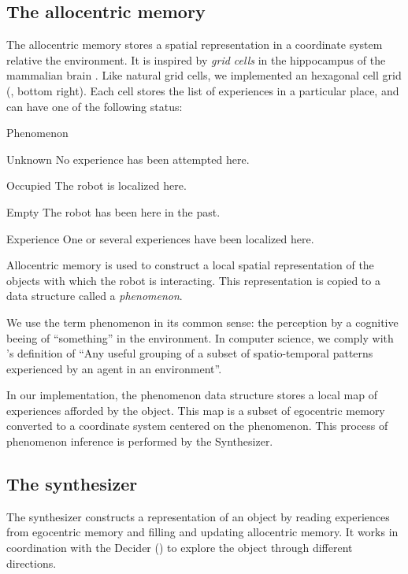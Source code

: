 \documentclass[pmlr]{jmlr}%
\begin{document}
\subsection{The allocentric memory}

The allocentric memory stores a spatial representation in a coordinate system relative the environment. 
It is inspired by \textit{grid cells} in the hippocampus of the mammalian brain \citep{grieves_representation_2017}.
Like natural grid cells, we implemented an hexagonal cell grid (, bottom right). 
Each cell stores the list of experiences in a particular place, and can have one of the following status:

\begin{altdescription}{Phenomenon}
	\item[Unknown] No experience has been attempted here.
	\item[Occupied] The robot is localized here.
	\item[Empty] The robot has been here in the past.
	\item[Experience] One or several experiences have been localized here.
\end{altdescription}

Allocentric memory is used to construct a local spatial representation of the objects with which the robot is interacting.
This representation is copied to a data structure called a \textit{phenomenon}.

We use the term phenomenon in its common sense: the perception by a cognitive beeing of ``something'' in the environment.
In computer science, we comply with \cite{thorisson_explanation_2021}'s definition of ``Any useful grouping of a subset of spatio-temporal patterns experienced by an agent in an environment''.

In our implementation, the phenomenon data structure stores a local map of experiences afforded by the object. 
This map is a subset of egocentric memory converted to a coordinate system centered on the phenomenon.
This process of phenomenon inference is performed by the Synthesizer.

\subsection{The synthesizer}
\label{sec:synthesizer}


The synthesizer constructs a representation of an object by reading experiences from egocentric memory and filling and updating allocentric memory. 
It works in coordination with the Decider () to explore the object through different directions. 
\end{document}
